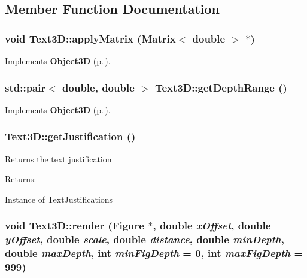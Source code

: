 \subsection{Member Function Documentation}
\subsubsection{\setlength{\rightskip}{0pt plus 5cm}void Text3D::apply\-Matrix ({\bf Matrix}$<$ double $>$ $\ast$)\hspace{0.3cm}{\tt  [virtual]}}\label{classText3D_a7}




Implements {\bf Object3D} {\rm (p.\,\pageref{classObject3D_a2})}.
\subsubsection{\setlength{\rightskip}{0pt plus 5cm}std::pair$<$ double, double $>$ Text3D::get\-Depth\-Range ()\hspace{0.3cm}{\tt  [virtual]}}\label{classText3D_a5}




Implements {\bf Object3D} {\rm (p.\,\pageref{classObject3D_a0})}.
\subsubsection{ Text3D::get\-Justification ()\hspace{0.3cm}{\tt  [inline]}}\label{classText3D_a4}


Returns the text justification \begin{Desc}
\item[Returns: ]\par
Instance of Text\-Justifications \end{Desc}
\subsubsection{\setlength{\rightskip}{0pt plus 5cm}void Text3D::render ({\bf Figure} $\ast$, double {\em x\-Offset}, double {\em y\-Offset}, double {\em scale}, double {\em distance}, double {\em min\-Depth}, double {\em max\-Depth}, int {\em min\-Fig\-Depth} = 0, int {\em max\-Fig\-Depth} = 999)\hspace{0.3cm}{\tt  [virtual]}}\label{classText3D_a6}




